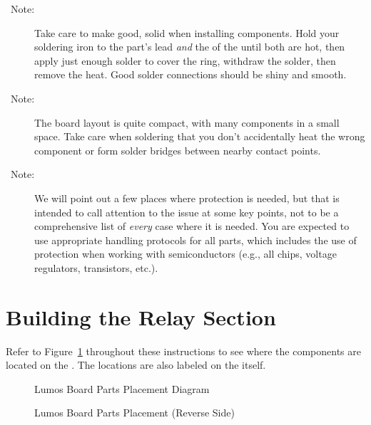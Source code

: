\documentclass[letterpaper,twoside,onecolumn,openright,final]{memoir}
\begin{document}
\begin{description}
\item[\HandRight\ Note:] Take care to make good, solid  when installing components.
Hold your soldering iron to the part's lead \emph{and} the  of the 
until both are hot, then apply just enough solder to cover the ring, withdraw the solder, then 
remove the heat.  Good solder connections should be shiny and smooth.

\item[\HandRight\ Note:] The board layout is quite compact, with many components in a small space.  Take
care when soldering that you don't accidentally heat the wrong component or form solder bridges between
nearby contact points.

\item[\HandRight\ Note:] We will point out a few places where  protection is needed, but
that is intended to call attention to the issue at some key points, not to be a comprehensive list of
\emph{every} case where it is needed.  You are expected to use appropriate handling protocols for all
parts, which includes the use of  protection when working with semiconductors (e.g., all
chips, voltage regulators, transistors, etc.).
\end{description}


\section{Building the Relay Section}
Refer to Figure~\ref{fig:placement} throughout these instructions to see where the components are 
located on the .  The locations are also labeled on the  itself.

\begin{figure}
\centerline{}
\caption{Lumos Board Parts Placement Diagram\label{fig:placement}}
\end{figure}
\begin{figure}
\centerline{}
\caption{Lumos Board Parts Placement (Reverse Side)\label{fig:placement-back}}
\end{figure}
\end{document}
